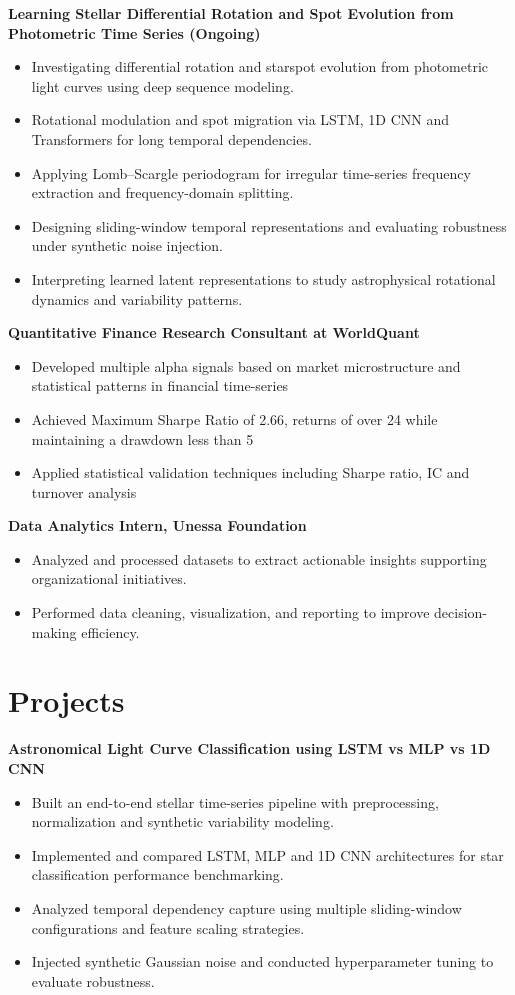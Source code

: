 \documentclass[a4paper,10pt]{article}
\begin{document}
\noindent\textbf{Learning Stellar Differential Rotation and Spot Evolution from Photometric Time Series (Ongoing)}
\begin{itemize}
    \item Investigating differential rotation and starspot evolution from photometric light curves using deep sequence modeling.
    \item Rotational modulation and spot migration via LSTM, 1D CNN and Transformers for long temporal dependencies.
    \item Applying Lomb--Scargle periodogram for irregular time-series frequency extraction and frequency-domain splitting.
    \item Designing sliding-window temporal representations and evaluating robustness under synthetic noise injection.
    \item Interpreting learned latent representations to study astrophysical rotational dynamics and variability patterns.
\end{itemize}
\noindent\textbf{Quantitative Finance Research Consultant at WorldQuant}
\begin{itemize}
    \item Developed multiple alpha signals based on market microstructure and statistical patterns in financial time-series
    \item Achieved Maximum Sharpe Ratio of 2.66, returns of over 24 while maintaining a drawdown less than 5%
    \item Applied statistical validation techniques including Sharpe ratio, IC and turnover analysis
\end{itemize}
\noindent\textbf{Data Analytics Intern, Unessa Foundation} 
\begin{itemize}
    \item Analyzed and processed datasets to extract actionable insights supporting organizational initiatives.
    \item Performed data cleaning, visualization, and reporting to improve decision-making efficiency.
\end{itemize}

\section{Projects}

\noindent\textbf{Astronomical Light Curve Classification using LSTM vs MLP vs 1D CNN}
\begin{itemize}
    \item Built an end-to-end stellar time-series pipeline with preprocessing, normalization and synthetic variability modeling.
    \item Implemented and compared LSTM, MLP and 1D CNN architectures for star classification performance benchmarking.
    \item Analyzed temporal dependency capture using multiple sliding-window configurations and feature scaling strategies.
    \item Injected synthetic Gaussian noise and conducted hyperparameter tuning to evaluate robustness.
\end{itemize}
\end{document}
